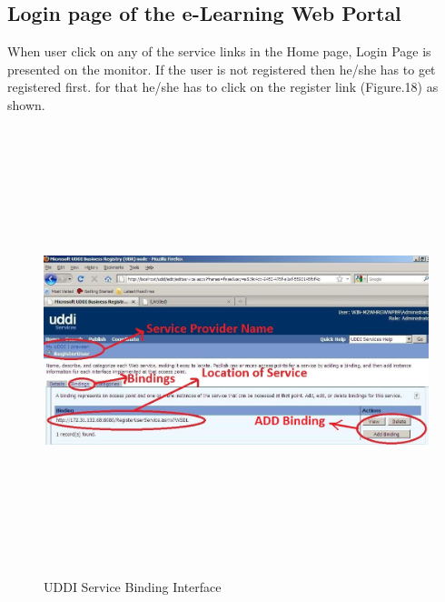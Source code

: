 \subsection{Login page of the e-Learning Web Portal}
When user click on any of the service links in the Home page, Login Page is presented on the monitor. If the user is not registered then he/she has to get registered first. for that he/she has to 
click on the register link (Figure.18) as shown.
\begin{figure}[h!]
 \centering
 \includegraphics[width=16cm,height=13cm]{uddi_service_binding_interface.jpg}
 \caption{UDDI Service Binding Interface}
\end{figure}
